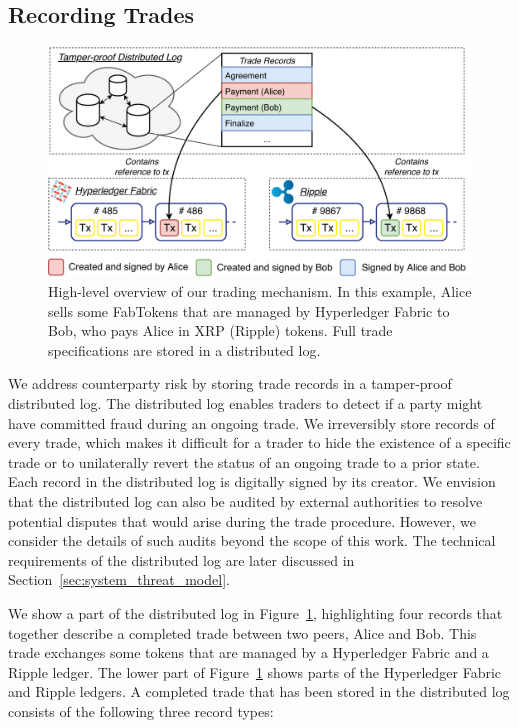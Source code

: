 \subsection{Recording Trades}

\begin{figure}[t]
	\centering
	\includegraphics[width=.75\linewidth]{xchange/assets/xchange}
	\caption{High-level overview of our \ModelName{} trading mechanism. In this example, Alice sells some FabTokens that are managed by Hyperledger Fabric to Bob, who pays Alice in XRP (Ripple) tokens. Full trade specifications are stored in a distributed log.}
	\label{fig:xchange}
\end{figure}

We address counterparty risk by storing trade records in a tamper-proof distributed log.
The distributed log enables \ModelName{} traders to detect if a party might have committed fraud during an ongoing trade.
We irreversibly store records of every trade, which makes it difficult for a trader to hide the existence of a specific trade or to unilaterally revert the status of an ongoing trade to a prior state.
Each record in the distributed log is digitally signed by its creator.
We envision that the distributed log can also be audited by external authorities to resolve potential disputes that would arise during the trade procedure.
However, we consider the details of such audits beyond the scope of this work.
The technical requirements of the distributed log are later discussed in Section~\ref{sec:system_threat_model}.

We show a part of the distributed log in Figure~\ref{fig:xchange}, highlighting four records that together describe a completed trade between two peers, Alice and Bob.
This trade exchanges some tokens that are managed by a Hyperledger Fabric and a Ripple ledger.
The lower part of Figure~\ref{fig:xchange} shows parts of the Hyperledger Fabric and Ripple ledgers.
A completed trade that has been stored in the distributed log consists of the following three record types:

